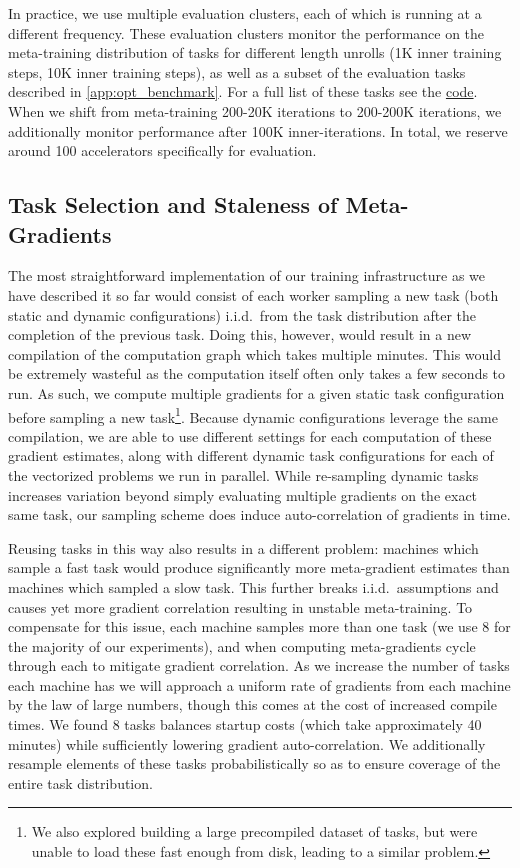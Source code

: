 \documentclass[11pt]{article}
\begin{document}
In practice, we use multiple evaluation clusters, each of which is running at a different frequency.
These evaluation clusters monitor the performance on the meta-training distribution of tasks for different length unrolls (1K inner training steps, 10K inner training steps), as well as a subset of the evaluation tasks described in \ref{app:opt_benchmark}.
For a full list of these tasks see the \href{https://github.com/google/learned_optimization/blob/b1d8267c5e513a4112e7422b98bacc16e1f0e844/learned_optimization/continuous_eval/evaluation_set.py#L90}{code}.
When we shift from meta-training 200-20K iterations to 200-200K iterations, we additionally monitor performance after 100K inner-iterations.
In total, we reserve around 100 accelerators specifically for evaluation.


\subsection{Task Selection and Staleness of Meta-Gradients}\label{app:distributed:staleness}
The most straightforward implementation of our training infrastructure as we have described it so far would consist of each worker sampling a new task (both static and dynamic configurations) i.i.d.~from the task distribution after the completion of the previous task.
Doing this, however, would result in a new compilation of the computation graph which takes multiple minutes.
This would be extremely wasteful as the computation itself often only takes a few seconds to run.
As such, we compute multiple gradients for a given static task configuration before sampling a new task\footnote{We also explored building a large precompiled dataset of tasks, but were unable to load these fast enough from disk, leading to a similar problem.}.
Because dynamic configurations leverage the same compilation, we are able to use different settings for each computation of these gradient estimates, along with different dynamic task configurations for each of the vectorized problems we run in parallel.
While re-sampling dynamic tasks increases variation beyond simply evaluating multiple gradients on the exact same task, our sampling scheme does induce auto-correlation of gradients in time. 

Reusing tasks in this way also results in a different problem: machines which sample a fast task would produce significantly more meta-gradient estimates than machines which sampled a slow task.
This further breaks i.i.d.~assumptions and causes yet more gradient correlation resulting in unstable meta-training.
To compensate for this issue, each machine samples more than one task (we use 8 for the majority of our experiments), and when computing meta-gradients cycle through each to mitigate gradient correlation.
As we increase the number of tasks each machine has we will approach a uniform rate of gradients from each machine by the law of large numbers, though this comes at the cost of increased compile times.
We found 8 tasks balances startup costs (which take approximately 40 minutes) while sufficiently lowering gradient auto-correlation.
We additionally resample elements of these tasks probabilistically so as to ensure coverage of the entire task distribution.
\end{document}
